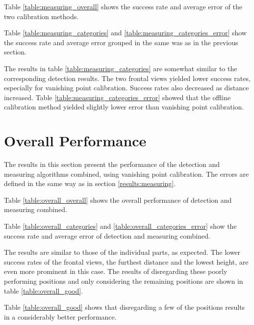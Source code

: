 Table \ref{table:measuring_overall} shows the success rate and average error of the two calibration methods.


Table \ref{table:measuring_categories} and \ref{table:measuring_categories_error} show the success rate and average error grouped in the same was as in the previous section.





The results in table \ref{table:measuring_categories} are somewhat similar to the corresponding detection results.
The two frontal views yielded lower success rates, especially for vanishing point calibration.
Success rates also decreased as distance increased.
Table \ref{table:measuring_categories_error} showed that the offline calibration method yielded slightly lower error than vanishing point calibration.

\section{Overall Performance} \label{results:overall}
The results in this section present the performance of the detection and measuring algorithms combined, using vanishing point calibration.
The errors are defined in the same way as in section \ref{results:measuring}.

Table \ref{table:overall_overall} shows the overall performance of detection and measuring combined.



Table \ref{table:overall_categories} and \ref{table:overall_categories_error} show the success rate and average error of detection and measuring combined.





The results are similar to those of the individual parts, as expected.
The lower success rates of the frontal views, the furthest distance and the lowest height, are even more prominent in this case.
The results of disregarding these poorly performing positions and only considering the remaining positions are shown in table \ref{table:overall_good}.



Table \ref{table:overall_good} shows that disregarding a few of the positions results in a considerably better performance.

